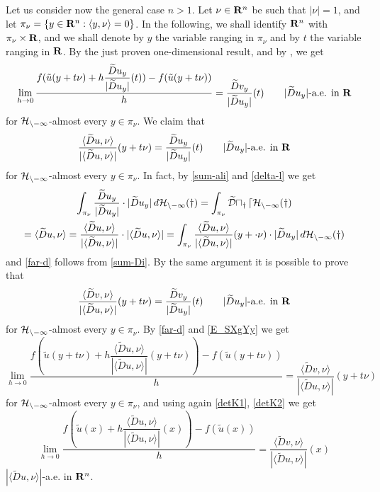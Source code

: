 Let us consider now the general case $n>1$. Let $\nu\in\bold
R^n$ be such that $|\nu|=1$, and let $\pi_\nu=\{y\in\bold R^n: \langle
y,\nu\rangle =0\}$. In the following, we shall identify $\bold R^n$ with
$\pi_\nu\times\bold R$, and we shall denote by $y$ the variable ranging in
$\pi_\nu$ and by $t$ the variable ranging in $\bold R$. By the just proven
one-dimensional result, and by , we get
\[\lim_{h\to 0}\frac{f(\tilde u(y+t\nu)+h\dfrac{\widetilde{D}u_y}{|
\widetilde{D}u_y|}(t))-f(\tilde u(y+t\nu))}h=\frac{\widetilde{D}v_y}{|
\widetilde{D}u_y|}(t)\qquad|\widetilde{D}u_y|\text{-a.e. in }\bold R\]
for $\cal H_{n-1}$-almost every $y\in \pi_\nu$. We claim that
\begin{equation}
\frac{\langle \widetilde{D}u,\nu\rangle }{|\langle \widetilde{D}u,\nu\rangle
|}(y+t\nu)=\frac{\widetilde{D}u_y}
{|\widetilde{D}u_y|}(t)\qquad|\widetilde{D}u_y|\text{-a.e. in }\bold R
\end{equation}
for $\cal H_{n-1}$-almost every $y\in\pi_\nu$. In fact, by
\eqref{sum-ali} and \eqref{delta-l} we get
\begin{multline*}
\int_{\pi_\nu}\frac{\widetilde{D}u_y}{|\widetilde{D}u_y|}\cdot|\widetilde{D}u_y
|\,d\cal H_{n-1}(y)=\int_{\pi_\nu}\widetilde{D}u_y\,d\cal H_{n-1}(y)\\
=\langle \widetilde{D}u,\nu\rangle =\frac
{\langle \widetilde{D}u,\nu\rangle }{|\langle \widetilde{D}u,\nu\rangle|}\cdot
|\langle \widetilde{D}u,\nu\rangle |=\int_{\pi_\nu}\frac{
\langle \widetilde{D}u,\nu\rangle }{|\langle \widetilde{D}u,\nu\rangle |}
(y+\cdot \nu)\cdot|\widetilde{D}u_y|\,d\cal H_{n-1}(y)
\end{multline*}
and \eqref{far-d} follows from \eqref{sum-Di}. By the same argument it
is possible to prove that
\begin{equation}
\frac{\langle \widetilde{D}v,\nu\rangle }{|\langle \widetilde{D}u,\nu\rangle
|}(y+t\nu)=\frac{\widetilde{D}v_y}{|\widetilde{D}u_y|}(t)\qquad|
\widetilde{D}u_y|\text{-a.e. in }\bold R\end{equation}
for $\cal H_{n-1}$-almost every $y\in \pi_\nu$. By \eqref{far-d}
and \eqref{E_SXgYy} we get
\[
\lim_{h\to 0}\frac{f(\tilde u(y+t\nu)+h\dfrac{\langle \widetilde{D}
u,\nu\rangle }{|\langle \widetilde{D}u,\nu\rangle |}(y+t\nu))-f(\tilde
u(y+t\nu))}{h}
=\frac{\langle \widetilde{D}v,\nu\rangle }{|\langle
\widetilde{D}u,\nu\rangle |}(y+t\nu)\]
for $\cal H_{n-1}$-almost every $y\in\pi_\nu$, and using again
\eqref{detK1}, \eqref{detK2} we get
\[
\lim_{h\to 0}\frac{f(\tilde u(x)+h\dfrac{\langle
\widetilde{D}u,\nu\rangle }{|\langle \widetilde{D}u,\nu\rangle |}(x))-f(\tilde
u(x))}{h}=\frac{\langle \widetilde{D}v,\nu\rangle }{|\langle \widetilde{D}u,\nu
\rangle |}(x)
\]
$|\langle \widetilde{D}u,\nu\rangle|$-a.e. in $\bold R^n$.

